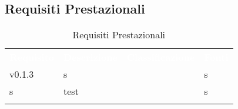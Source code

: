 \subsection{Requisiti Prestazionali}




\renewcommand{\arraystretch}{1.5}
\begin{longtable}{ m{}<{\centering}  m{}<{\centering}  m{}<{\centering}  m{}<{\centering}}
	\rowcolor{darkblue}
	\textcolor{white}{\textbf{Requisito}} &\textcolor{white}{\textbf{Descrizione}}& \textcolor{white}{\textbf{Classificazione}} & \textcolor{white}{\textbf{Fonti}}\\ 

	v0.1.3 & s & \Ob & s\\	

	s & test & \Ob & s\\		

	\caption{Requisiti Prestazionali}
\end{longtable}